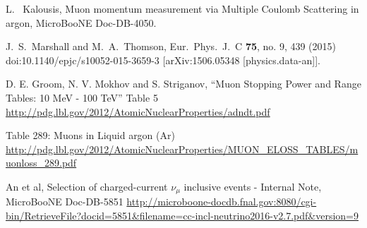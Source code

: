 \begin{thebibliography}{1}
  L. ~Kalousis, 
  Muon momentum measurement via Multiple Coulomb Scattering in argon,
  MicroBooNE Doc-DB-4050.

  J.~S.~Marshall and M.~A.~Thomson,
  Eur.\ Phys.\ J.\ C {\bf 75}, no. 9, 439 (2015)
  doi:10.1140/epjc/s10052-015-3659-3
  [arXiv:1506.05348 [physics.data-an]].

  D. E. Groom, N. V. Mokhov and S. Striganov, ``Muon Stopping Power and Range Tables: 10 MeV - 100 TeV'' Table 5
  \url{http://pdg.lbl.gov/2012/AtomicNuclearProperties/adndt.pdf}


   Table 289: Muons in Liquid argon (Ar) \url{http://pdg.lbl.gov/2012/AtomicNuclearProperties/MUON_ELOSS_TABLES/muonloss_289.pdf}

  An et al,
  Selection of charged-current $\nu_\mu$ inclusive events - Internal Note,
  MicroBooNE Doc-DB-5851
  \url{http://microboone-docdb.fnal.gov:8080/cgi-bin/RetrieveFile?docid=5851&filename=cc-incl-neutrino2016-v2.7.pdf&version=9}




\end{thebibliography}